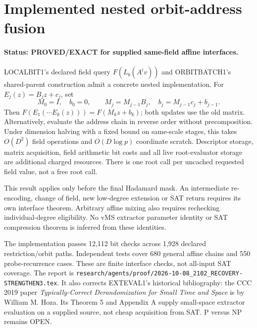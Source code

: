 \section{Implemented nested orbit-address fusion}
\label{sec:recovery-strengthen3-wrapper}
\paragraph{Status: PROVED/EXACT for supplied same-field affine interfaces.}
LOCALBIT1's declared field query $F(L_b(A^iv))$ and ORBITBATCH1's
shared-parent construction admit a concrete nested implementation.
For $E_j(z)=B_jz+c_j$, set
\[
 M_0=I,\quad b_0=0,\qquad
 M_j=M_{j-1}B_j,\quad b_j=M_{j-1}c_j+b_{j-1}.
\]
Then $F(E_1(\cdots E_k(z)))=F(M_kz+b_k)$; both updates use the old
matrix. Alternatively, evaluate the address chain in reverse order
without precomposition. Under dimension halving with a fixed bound on
same-scale stages, this takes $O(D^2)$ field operations and $O(D\log p)$
coordinate scratch. Descriptor storage, matrix acquisition, field
arithmetic bit costs and all live root-evaluator storage are additional
charged resources. There is one root call per uncached requested field
value, not a free root call.

This result applies only before the final Hadamard mask. An intermediate
re-encoding, change of field, new low-degree extension or SAT return
requires its own interface theorem. Arbitrary affine mixing also requires
rechecking individual-degree eligibility. No vMS extractor parameter
identity or SAT compression theorem is inferred from these identities.

The implementation passes 12,112 bit checks across 1,928 declared
restriction/orbit paths. Independent tests cover 680 general affine
chains and 550 probe-recurrence cases. These are finite interface checks,
not all-input SAT coverage. The report is
\nolinkurl{research/agents/proof/2026-10-08_2102_RECOVERY-STRENGTHEN3.tex}.
It also corrects EXTEVAL1's historical bibliography: the CCC 2019 paper
\emph{Typically-Correct Derandomization for Small Time and Space} is by
William M. Hoza. Its Theorem 5 and Appendix A supply small-space extractor
evaluation on a supplied source, not cheap acquisition from SAT.
P versus NP remains OPEN.
